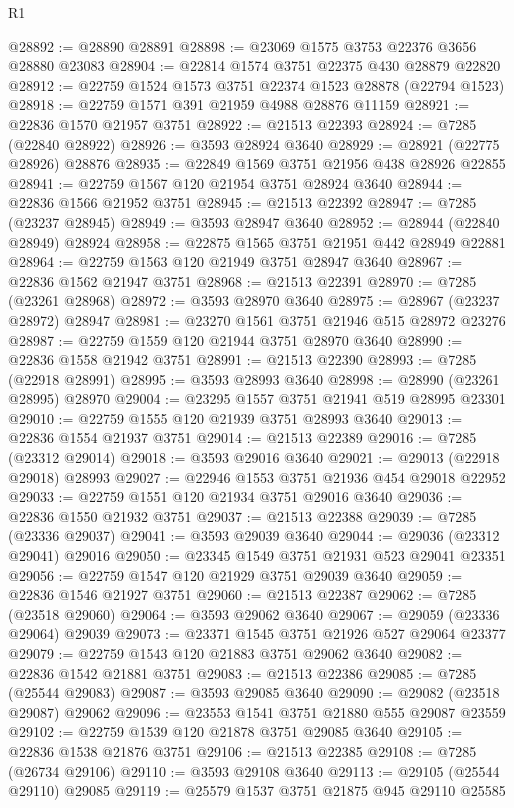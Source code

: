 \begin{lexlean}{R1}
\begin{coremodule}
@28892 := @28890 @28891
@28898 := @23069 @1575 @3753 @22376 @3656 @28880 @23083
@28904 := @22814 @1574 @3751 @22375 @430 @28879 @22820
@28912 := @22759 @1524 @1573 @3751 @22374 @1523 @28878 (@22794 @1523)
@28918 := @22759 @1571 @391 @21959 @4988 @28876 @11159
@28921 := @22836 @1570 @21957 @3751
@28922 := @21513 @22393
@28924 := @7285 (@22840 @28922)
@28926 := @3593 @28924 @3640
@28929 := @28921 (@22775 @28926) @28876
@28935 := @22849 @1569 @3751 @21956 @438 @28926 @22855
@28941 := @22759 @1567 @120 @21954 @3751 @28924 @3640
@28944 := @22836 @1566 @21952 @3751
@28945 := @21513 @22392
@28947 := @7285 (@23237 @28945)
@28949 := @3593 @28947 @3640
@28952 := @28944 (@22840 @28949) @28924
@28958 := @22875 @1565 @3751 @21951 @442 @28949 @22881
@28964 := @22759 @1563 @120 @21949 @3751 @28947 @3640
@28967 := @22836 @1562 @21947 @3751
@28968 := @21513 @22391
@28970 := @7285 (@23261 @28968)
@28972 := @3593 @28970 @3640
@28975 := @28967 (@23237 @28972) @28947
@28981 := @23270 @1561 @3751 @21946 @515 @28972 @23276
@28987 := @22759 @1559 @120 @21944 @3751 @28970 @3640
@28990 := @22836 @1558 @21942 @3751
@28991 := @21513 @22390
@28993 := @7285 (@22918 @28991)
@28995 := @3593 @28993 @3640
@28998 := @28990 (@23261 @28995) @28970
@29004 := @23295 @1557 @3751 @21941 @519 @28995 @23301
@29010 := @22759 @1555 @120 @21939 @3751 @28993 @3640
@29013 := @22836 @1554 @21937 @3751
@29014 := @21513 @22389
@29016 := @7285 (@23312 @29014)
@29018 := @3593 @29016 @3640
@29021 := @29013 (@22918 @29018) @28993
@29027 := @22946 @1553 @3751 @21936 @454 @29018 @22952
@29033 := @22759 @1551 @120 @21934 @3751 @29016 @3640
@29036 := @22836 @1550 @21932 @3751
@29037 := @21513 @22388
@29039 := @7285 (@23336 @29037)
@29041 := @3593 @29039 @3640
@29044 := @29036 (@23312 @29041) @29016
@29050 := @23345 @1549 @3751 @21931 @523 @29041 @23351
@29056 := @22759 @1547 @120 @21929 @3751 @29039 @3640
@29059 := @22836 @1546 @21927 @3751
@29060 := @21513 @22387
@29062 := @7285 (@23518 @29060)
@29064 := @3593 @29062 @3640
@29067 := @29059 (@23336 @29064) @29039
@29073 := @23371 @1545 @3751 @21926 @527 @29064 @23377
@29079 := @22759 @1543 @120 @21883 @3751 @29062 @3640
@29082 := @22836 @1542 @21881 @3751
@29083 := @21513 @22386
@29085 := @7285 (@25544 @29083)
@29087 := @3593 @29085 @3640
@29090 := @29082 (@23518 @29087) @29062
@29096 := @23553 @1541 @3751 @21880 @555 @29087 @23559
@29102 := @22759 @1539 @120 @21878 @3751 @29085 @3640
@29105 := @22836 @1538 @21876 @3751
@29106 := @21513 @22385
@29108 := @7285 (@26734 @29106)
@29110 := @3593 @29108 @3640
@29113 := @29105 (@25544 @29110) @29085
@29119 := @25579 @1537 @3751 @21875 @945 @29110 @25585

\end{coremodule}
\end{lexlean}
